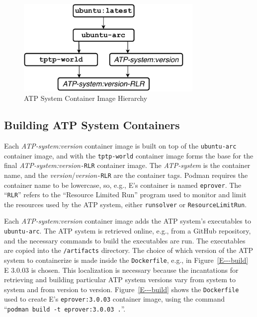 \documentclass{easychair}
\begin{document}
\begin{figure}[htb]
\begin{center}
\includegraphics[width=0.8\textwidth]{ImageDAG} 
\caption{ATP System Container Image Hierarchy}
\label{ImageDAG}
\end{center}
\end{figure}

\subsection{Building ATP System Containers}
\label{BuildingATPSystemImages}

Each {\em ATP-system:version} container image is built on top of the {\tt ubuntu-arc} container 
image, and with the {\tt tptp-world} container image forms the base for the final 
{\em ATP-system:version}{\tt -RLR} container image.
The {\em ATP-system} is the container name, and the {\em version}/{\em version}{\tt -RLR} are 
the container tags.
Podman requires the container name to be lowercase, so, e.g., E's container is named {\tt eprover}.
The ``{\tt RLR}'' refers to the ``Resource Limited Run'' program used to monitor and limit the 
resources used by the ATP system, either {\tt runsolver} or {\tt ResourceLimitRun}.

Each {\em ATP-system:version} container image adds the ATP system's executables to 
{\tt ubuntu-arc}.
The ATP system is retrieved online, e.g., from a GitHub repository, and the necessary commands
to build the executables are run.
The executables are copied into the {\tt /artifacts} directory.
The choice of which version of the ATP system to containerize is made inside the {\tt Dockerfile},
e.g., in Figure~\ref{E---build} E 3.0.03 is chosen.
This localization is necessary because the incantations for retrieving and building particular 
ATP system versions vary from system to system and from version to version.
Figure~\ref{E---build} shows the {\tt Dockerfile} used to create E's {\tt eprover:3.0.03} 
container image, using the command ``{\tt podman~build~-t~eprover:3.0.03~.}''.
\end{document}
